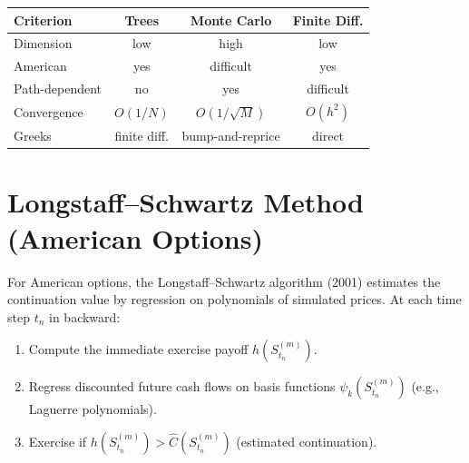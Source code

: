\begin{center}
\begin{tabular}{lccc}
    \toprule
    \textbf{Criterion} & \textbf{Trees} & \textbf{Monte Carlo}
    & \textbf{Finite Diff.} \\
    \midrule
    Dimension & low & high & low \\
    American & yes & difficult & yes \\
    Path-dependent & no & yes & difficult \\
    Convergence & $O(1/N)$ & $O(1/\sqrt{M})$ & $O(h^2)$ \\
    Greeks & finite diff. & bump-and-reprice & direct \\
    \bottomrule
\end{tabular}
\end{center}

\section{Longstaff--Schwartz Method (American Options)}

\begin{theorem}
For American options, the Longstaff--Schwartz algorithm (2001) estimates
the continuation value by regression on polynomials of simulated prices.
At each time step $t_n$ in backward:
\begin{enumerate}
    \item Compute the immediate exercise payoff $h(S_{t_n}^{(m)})$.
    \item Regress discounted future cash flows on basis functions
          $\psi_k(S_{t_n}^{(m)})$ (e.g., Laguerre polynomials).
    \item Exercise if $h(S_{t_n}^{(m)}) > \hat{C}(S_{t_n}^{(m)})$
          (estimated continuation).
\end{enumerate}
\end{theorem}

